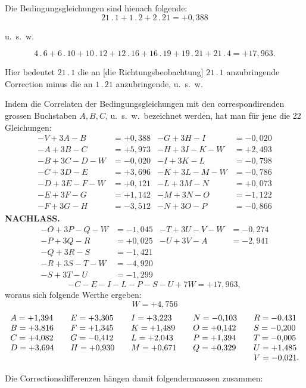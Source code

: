 \par\noindent\hspace*{\parindent}Die Bedingungsgleichungen sind hienach folgende:
\[
21\, .\,1+1\, .\,2+2\, .\,21=+0{,}388
\]
\begin{center}u.\ s.\ w.\end{center}
\[
4\, .\,6+6\, .\,10+10\, .\,12+12\, .\,16+16\, .\,19+19\, .\,21+21\, .\,4=+17{,}963.
\]
\par\noindent\hspace*{\parindent}Hier bedeutet \(21\, .\,1\) die an [die Richtungsbeobachtung] \(21\, .\,1\)
anzubringende Correction minus die an \(1\, .\,21\) anzubringende, u.\ s.\ w.

\par\noindent\hspace*{\parindent}Indem die Correlaten der Bedingungsgleichungen mit den correspondirenden
grossen Buchstaben \(A,B,C\), u.\ s.\ w.\ bezeichnet werden, hat man für jene die
22 Gleichungen:
\[
\begin{aligned}
-V+3A-B&=+0{,}388 & -G+3H-I&=-0{,}020\\
-A+3B-C&=+5{,}973 & -H+3I-K-W&=+2{,}493\\
-B+3C-D-W&=-0{,}020 & -I+3K-L&=-0{,}798\\
-C+3D-E&=+3{,}696 & -K+3L-M-W&=-0{,}786\\
-D+3E-F-W&=+0{,}121 & -L+3M-N&=+0{,}073\\
-E+3F-G&=+1{,}142 & -M+3N-O&=-1{,}122\\
-F+3G-H&=-3{,}512 & -N+3O-P&=-0{,}866
\end{aligned}
\]
\clearpage
{}\hfill\textbf{NACHLASS.}
\[
\begin{aligned}
-O+3P-Q-W&=-1{,}045 & -T+3U-V-W&=-0{,}274\\
-P+3Q-R&=+0{,}025 & -U+3V-A&=-2{,}941\\
-Q+3R-S&=-1{,}421\\
-R+3S-T-W&=-4{,}920\\
-S+3T-U&=-1{,}299
\end{aligned}
\]
\[
-C-E-I-L-P-S-U+7W=+17{,}963,
\]
\noindent woraus sich folgende Werthe ergeben:
\[
W=+4{,}756
\]
\[
\begin{array}{l@{\qquad}l@{\qquad}l@{\qquad}l@{\qquad}l}
A=+1{,}394&E=+3{,}305&I=+3{,}223&N=-0{,}103&R=-0{,}431\\
B=+3{,}816&F=+1{,}345&K=+1{,}489&O=+0{,}142&S=-0{,}200\\
C=+4{,}082&G=-0{,}412&L=+2{,}043&P=+1{,}394&T=-0{,}005\\
D=+3{,}694&H=+0{,}930&M=+0{,}671&Q=+0{,}329&U=+1{,}485\\
&&&&V=-0{,}021.
\end{array}
\]
\par\noindent\hspace*{\parindent}Die Correctionsdifferenzen hängen damit folgendermaassen zusammen:

